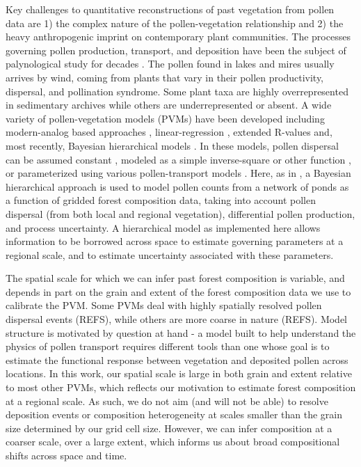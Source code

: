 \documentclass[12pt]{article}
\begin{document}
Key challenges to quantitative reconstructions of past vegetation from
pollen data are 1) the complex nature of the pollen-vegetation
relationship and 2) the heavy anthropogenic imprint on contemporary
plant communities. The processes governing pollen production,
transport, and deposition have been the subject of palynological study
for decades \citep{tauber1965, jacobson1981selection,
  jackson1994pollen, jackson1999pollen, sugita2007theory1,
  sugita2007theory2, prentice1988records}. The pollen found in lakes
and mires usually arrives by wind, coming from plants that vary in
their pollen productivity, dispersal, and pollination syndrome. Some
plant taxa are highly overrepresented in sedimentary archives while
others are underrepresented or absent. A wide variety of
pollen-vegetation models (PVMs) have been developed including
modern-analog based approaches \citep{williams2003variations},
linear-regression \citep{webb1981estimating,
  bradshaw1985relationships}, extended R-values
\citep{parsons1981statistical, sugita1994pollen, sugita2007theory1,
  sugita2007theory2} and, most recently, Bayesian hierarchical models
\citep{paciorek2009mapping, garreta2010method}.  In these models,
pollen dispersal can be assumed constant \citep{davis1963theory,
  parsons1981statistical}, modeled as a simple inverse-square or other
function \citep{webb1981estimating, calcote1995pollen,
  jackson1998quantitative}, or parameterized using various
pollen-transport models \citep{prentice1988records, sugita2007theory1,
  sugita2007theory2, jackson1999pollen}. Here, as in
\citet{paciorek2009mapping}, a Bayesian hierarchical approach is used
to model pollen counts from a network of ponds as a function of
gridded forest composition data, taking into account pollen dispersal
(from both local and regional vegetation), differential pollen
production, and process uncertainty. A hierarchical model as
implemented here allows information to be borrowed across space to
estimate governing parameters at a regional scale, and to estimate
uncertainty associated with these parameters.

The spatial scale for which we can infer past forest composition is
variable, and depends in part on the grain and extent of the forest
composition data we use to calibrate the PVM. Some PVMs deal with
highly spatially resolved pollen dispersal events (REFS), while others
are more coarse in nature (REFS). Model structure is motivated by
question at hand - a model built to help understand the physics of
pollen transport requires different tools than one whose goal is to
estimate the functional response between vegetation and deposited
pollen across locations. In this work, our spatial scale is large in
both grain and extent relative to most other PVMs, which reflects our
motivation to estimate forest composition at a regional scale. As
such, we do not aim (and will not be able) to resolve deposition
events or composition heterogeneity at scales smaller than the grain
size determined by our grid cell size. However, we can infer
composition at a coarser scale, over a large extent, which informs us
about broad compositional shifts across space and time.
\end{document}
